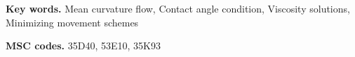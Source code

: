\documentclass[11pt]{article}
\numberwithin{equation}{section}
\newcommand{\fix}[1]{\textcolor{red}{#1}}
\providecommand{\keywords}[1]{\textbf{Key words.} #1}
\providecommand{\MSC}[1]{\textbf{MSC codes.} #1}
\begin{document}




\keywords{Mean curvature flow, Contact angle condition, Viscosity solutions, Minimizing movement schemes}



\vspace{0.2cm}

\MSC{35D40, 53E10, 35K93}





\end{document}

